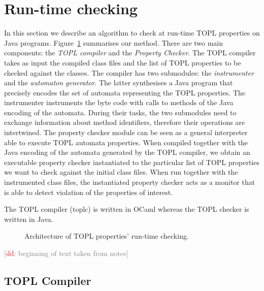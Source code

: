 \documentclass{sigplanconf}[10pt] %
\newcommand{\noterg}[2]{\textcolor{gray}{[\textcolor{red}{#1}: #2]}}
\newcommand{\dd}[1]{\noterg{dd}{#1}}
\newcommand{\dinocomment}[1]{\dd{#1}}
\begin{document}
\section{Run-time checking}
\label{sec:dynamic}
In this section we describe an algorithm to check at run-time  TOPL properties on Java programs.
%
Figure~\ref{architecture} summarises our method. There are two main components: 
the {\em TOPL compiler} and the {\em Property Checker}.
The TOPL compiler takes as input the compiled class files and the list of TOPL properties to be checked against the classes. The compiler has two submodules: the {\em instrumenter} and the {\em automaton generator}.
The latter synthesises a Java program that precisely encodes the set of automata representing the TOPL properties. The instrumenter instruments the byte code with calls to methods of the Java encoding of the automata.
During their tasks, the two submodules need to exchange information about method identifiers, therefore their operations are intertwined.   
The property checker module can be seen as a general interpreter able to execute TOPL automata properties. When compiled together with the Java encoding of the automata generated by the TOPL compiler, we obtain an executable property checker instantiated to the particular list of TOPL properties we want to check against the initial class files.
When run together with the instrumented class files, the instantiated property checker acts as a monitor that is able to detect violation of the properties of interest.

The TOPL compiler (\textsf{toplc}) is written in OCaml whereas  the TOPL checker is written in Java.

%
\begin{figure}[htbp]
\begin{center}

\caption{Architecture of TOPL properties' run-time checking.}
\label{architecture}
\end{center}
\end{figure}


\dinocomment{beginning of text taken from notes}

\subsection{TOPL Compiler} %
\end{document}
